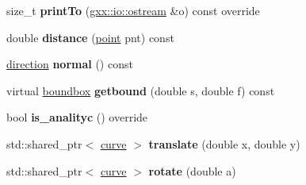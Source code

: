\begin{DoxyCompactItemize}
\item 
size\+\_\+t {\bfseries print\+To} (\hyperlink{classgxx_1_1io_1_1ostream}{gxx\+::io\+::ostream} \&o) const override\hypertarget{classgxx_1_1geom2_1_1line_a1ed9c8bf2862b6474dc0dfe43289d353}{}\label{classgxx_1_1geom2_1_1line_a1ed9c8bf2862b6474dc0dfe43289d353}

\item 
double {\bfseries distance} (\hyperlink{classmalgo_1_1vector2}{point} pnt) const \hypertarget{classgxx_1_1geom2_1_1line_ade5b131f157bf9805756db3e8f524438}{}\label{classgxx_1_1geom2_1_1line_ade5b131f157bf9805756db3e8f524438}

\item 
\hyperlink{classmalgo_1_1unit__vector2}{direction} {\bfseries normal} () const \hypertarget{classgxx_1_1geom2_1_1line_a26b90a030a5fd8aa52dc1c160b26ea47}{}\label{classgxx_1_1geom2_1_1line_a26b90a030a5fd8aa52dc1c160b26ea47}

\item 
virtual \hyperlink{structgxx_1_1geom2_1_1boundbox}{boundbox} {\bfseries getbound} (double s, double f) const \hypertarget{classgxx_1_1geom2_1_1line_a13697abc313f9d8083854aee20ccf1ec}{}\label{classgxx_1_1geom2_1_1line_a13697abc313f9d8083854aee20ccf1ec}

\item 
bool {\bfseries is\+\_\+analityc} () override\hypertarget{classgxx_1_1geom2_1_1line_a24b36600c2dd089cbef4908ff4a495dc}{}\label{classgxx_1_1geom2_1_1line_a24b36600c2dd089cbef4908ff4a495dc}

\item 
std\+::shared\+\_\+ptr$<$ \hyperlink{classgxx_1_1geom2_1_1curve}{curve} $>$ {\bfseries translate} (double x, double y)\hypertarget{classgxx_1_1geom2_1_1line_ad800134104ac1765dc720fbd732db10a}{}\label{classgxx_1_1geom2_1_1line_ad800134104ac1765dc720fbd732db10a}

\item 
std\+::shared\+\_\+ptr$<$ \hyperlink{classgxx_1_1geom2_1_1curve}{curve} $>$ {\bfseries rotate} (double a)\hypertarget{classgxx_1_1geom2_1_1line_a1fe70d4a41cceff528bfc96cb14ea15a}{}\label{classgxx_1_1geom2_1_1line_a1fe70d4a41cceff528bfc96cb14ea15a}

\end{DoxyCompactItemize}

